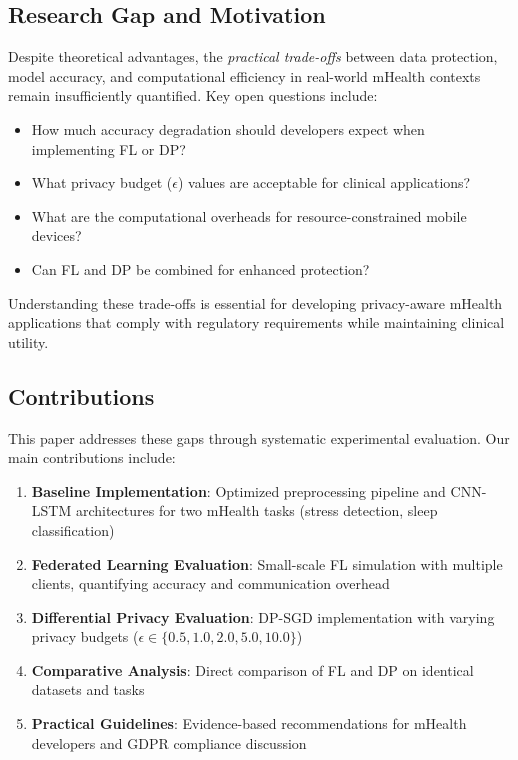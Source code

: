\documentclass[conference]{IEEEtran}
\begin{document}
\subsection{Research Gap and Motivation}

Despite theoretical advantages, the \textit{practical trade-offs} between data protection, model accuracy, and computational efficiency in real-world mHealth contexts remain insufficiently quantified. Key open questions include:

\begin{itemize}
    \item How much accuracy degradation should developers expect when implementing FL or DP?
    \item What privacy budget ($\epsilon$) values are acceptable for clinical applications?
    \item What are the computational overheads for resource-constrained mobile devices?
    \item Can FL and DP be combined for enhanced protection?
\end{itemize}

Understanding these trade-offs is essential for developing privacy-aware mHealth applications that comply with regulatory requirements while maintaining clinical utility.

\subsection{Contributions}

This paper addresses these gaps through systematic experimental evaluation. Our main contributions include:

\begin{enumerate}
    \item \textbf{Baseline Implementation}: Optimized preprocessing pipeline and CNN-LSTM architectures for two mHealth tasks (stress detection, sleep classification)
    \item \textbf{Federated Learning Evaluation}: Small-scale FL simulation with multiple clients, quantifying accuracy and communication overhead
    \item \textbf{Differential Privacy Evaluation}: DP-SGD implementation with varying privacy budgets ($\epsilon \in \{0.5, 1.0, 2.0, 5.0, 10.0\}$)
    \item \textbf{Comparative Analysis}: Direct comparison of FL and DP on identical datasets and tasks
    \item \textbf{Practical Guidelines}: Evidence-based recommendations for mHealth developers and GDPR compliance discussion
\end{enumerate}
\end{document}
